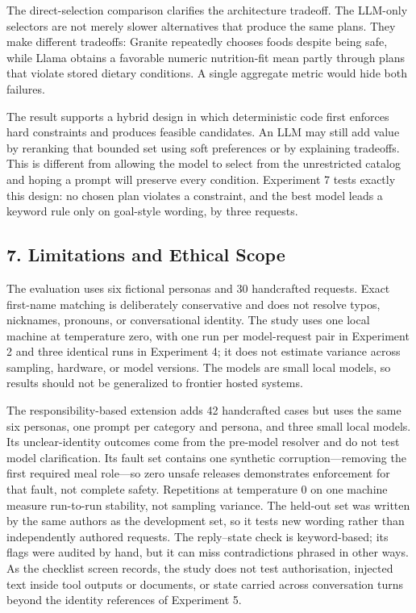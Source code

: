 \documentclass[
  10pt,
  letterpaper,
]{article}
\begin{document}
The direct-selection comparison clarifies the architecture tradeoff. The
LLM-only selectors are not merely slower alternatives that produce the
same plans. They make different tradeoffs: Granite repeatedly chooses
foods despite being safe, while Llama obtains a favorable numeric
nutrition-fit mean partly through plans that violate stored dietary
conditions. A single aggregate metric would hide both failures.

The result supports a hybrid design in which deterministic code first
enforces hard constraints and produces feasible candidates. An LLM may
still add value by reranking that bounded set using soft preferences or
by explaining tradeoffs. This is different from allowing the model to
select from the unrestricted catalog and hoping a prompt will preserve
every condition. Experiment 7 tests exactly this design: no chosen plan
violates a constraint, and the best model leads a keyword rule only on
goal-style wording, by three requests.

\subsection{7. Limitations and Ethical
Scope}\label{limitations-and-ethical-scope}

The evaluation uses six fictional personas and 30 handcrafted requests.
Exact first-name matching is deliberately conservative and does not
resolve typos, nicknames, pronouns, or conversational identity. The
study uses one local machine at temperature zero, with one run per
model-request pair in Experiment 2 and three identical runs in
Experiment 4; it does not estimate variance across sampling, hardware,
or model versions. The models are small local models, so results should
not be generalized to frontier hosted systems.

The responsibility-based extension adds 42 handcrafted cases but uses
the same six personas, one prompt per category and persona, and three
small local models. Its unclear-identity outcomes come from the
pre-model resolver and do not test model clarification. Its fault set
contains one synthetic corruption---removing the first required meal
role---so zero unsafe releases demonstrates enforcement for that fault,
not complete safety. Repetitions at temperature 0 on one machine measure
run-to-run stability, not sampling variance. The held-out set was
written by the same authors as the development set, so it tests new
wording rather than independently authored requests. The reply--state
check is keyword-based; its flags were audited by hand, but it can miss
contradictions phrased in other ways. As the checklist screen records,
the study does not test authorisation, injected text inside tool outputs
or documents, or state carried across conversation turns beyond the
identity references of Experiment 5.
\end{document}
